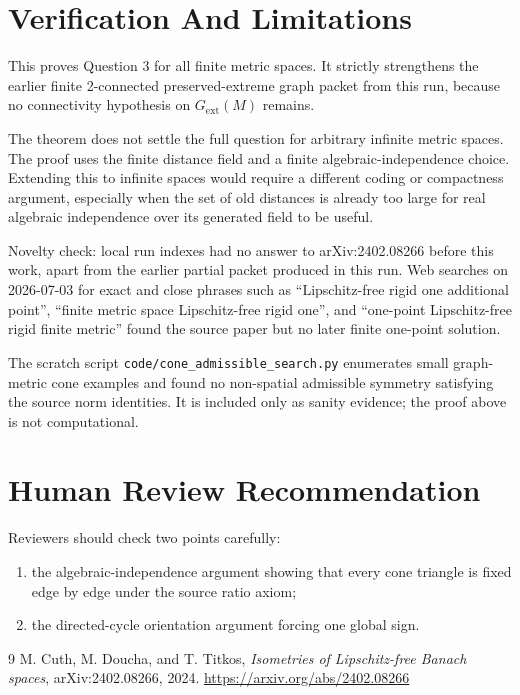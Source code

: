\documentclass[11pt]{article}
\begin{document}
\section*{Verification And Limitations}

This proves Question 3 for all finite metric spaces.  It strictly strengthens the earlier finite 2-connected preserved-extreme graph packet from this run, because no connectivity hypothesis on \(G_{\mathrm{ext}}(M)\) remains.

The theorem does not settle the full question for arbitrary infinite metric spaces.  The proof uses the finite distance field and a finite algebraic-independence choice.  Extending this to infinite spaces would require a different coding or compactness argument, especially when the set of old distances is already too large for real algebraic independence over its generated field to be useful.

Novelty check: local run indexes had no answer to arXiv:2402.08266 before this work, apart from the earlier partial packet produced in this run.  Web searches on 2026-07-03 for exact and close phrases such as ``Lipschitz-free rigid one additional point'', ``finite metric space Lipschitz-free rigid one'', and ``one-point Lipschitz-free rigid finite metric'' found the source paper but no later finite one-point solution.

The scratch script \texttt{code/cone\_admissible\_search.py} enumerates small graph-metric cone examples and found no non-spatial admissible symmetry satisfying the source norm identities.  It is included only as sanity evidence; the proof above is not computational.

\section*{Human Review Recommendation}

Reviewers should check two points carefully:
\begin{enumerate}
\item the algebraic-independence argument showing that every cone triangle is fixed edge by edge under the source ratio axiom;
\item the directed-cycle orientation argument forcing one global sign.
\end{enumerate}

\begin{thebibliography}{9}
M. Cuth, M. Doucha, and T. Titkos,
\emph{Isometries of Lipschitz-free Banach spaces},
arXiv:2402.08266, 2024.
\url{https://arxiv.org/abs/2402.08266}
\end{thebibliography}
\end{document}
